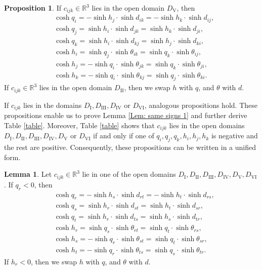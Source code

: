 \documentclass[12pt]{amsart}
\theoremstyle{definition}
\newtheorem{lemma}[theorem]{Lemma}
\newtheorem{proposition}[theorem]{Proposition}
\begin{document}
\begin{proposition}\label{Prop: space-like 1}
If $c_{ijk}\in \mathbb{R}^3$ lies in the open domain $D_\mathrm{V}$, then
\begin{equation*}
\begin{aligned}
&\cosh q_i=-\sinh h_j\cdot\sinh d_{ik}=-\sinh h_k\cdot\sinh d_{ij},\\
&\cosh q_j=\sinh h_i\cdot\sinh d_{jk}=\sinh h_k\cdot\sinh d_{ji},\\
&\cosh q_k=\sinh h_i\cdot\sinh d_{kj}=\sinh h_j\cdot\sinh d_{ki},\\
&\cosh h_i=\sinh q_j\cdot\sinh \theta_{ik}=\sinh q_k\cdot\sinh \theta_{ij},\\
&\cosh h_j=-\sinh q_i\cdot\sinh \theta_{jk}=\sinh q_k\cdot\sinh \theta_{ji},\\
&\cosh h_k=-\sinh q_i\cdot\sinh \theta_{kj}=\sinh q_j\cdot\sinh \theta_{ki}.
\end{aligned}
\end{equation*}
If $c_{ijk}\in \mathbb{R}^3$ lies in the open domain $D_\mathrm{II}$, then we swap $h$ with $q$, and $\theta$ with $d$.
\end{proposition}

If $c_{ijk}$ lies in the domains $D_\mathrm{I}, D_\mathrm{III}, D_\mathrm{IV}$ or $D_\mathrm{VI}$, analogous propositions hold.
These propositions enable us to prove Lemma \ref{Lem: same signs 1} and further derive Table \ref{table}.
Moreover, Table \ref{table} shows that $c_{ijk}$ lies in the open domains  $D_\mathrm{I}, D_\mathrm{II}, D_\mathrm{III}, D_\mathrm{IV}, D_\mathrm{V}$ or $D_\mathrm{VI}$ if and only if one of $q_i,q_j,q_k,h_i,h_j,h_k$ is negative and the rest are positive.
Consequently, these propositions can be written in a unified form.

\begin{lemma}\label{Lem: space-like 1}
Let $c_{ijk}\in \mathbb{R}^3$ lie in one of the open domains $D_\mathrm{I}, D_\mathrm{II}, D_\mathrm{III}, D_\mathrm{IV}, D_\mathrm{V}, D_\mathrm{VI}$.
If $q_r<0$, then
\begin{equation*}
\begin{aligned}
&\cosh q_r=-\sinh h_s\cdot\sinh d_{rt}
=-\sinh h_t\cdot\sinh d_{rs},\\
&\cosh q_s=\sinh h_r\cdot\sinh d_{st}
=\sinh h_t\cdot\sinh d_{sr},\\
&\cosh q_t=\sinh h_r\cdot\sinh d_{ts}
=\sinh h_s\cdot\sinh d_{tr},\\
&\cosh h_r=\sinh q_s\cdot\sinh \theta_{rt}
=\sinh q_t\cdot\sinh \theta_{rs},\\
&\cosh h_s=-\sinh q_r\cdot\sinh \theta_{st}
=\sinh q_t\cdot\sinh \theta_{sr},\\
&\cosh h_t=-\sinh q_r\cdot\sinh \theta_{ts}
=\sinh q_s\cdot\sinh \theta_{tr}.
\end{aligned}
\end{equation*}
If $h_r<0$, then we swap $h$ with $q$, and $\theta$ with $d$.
\end{lemma}
\end{document}
